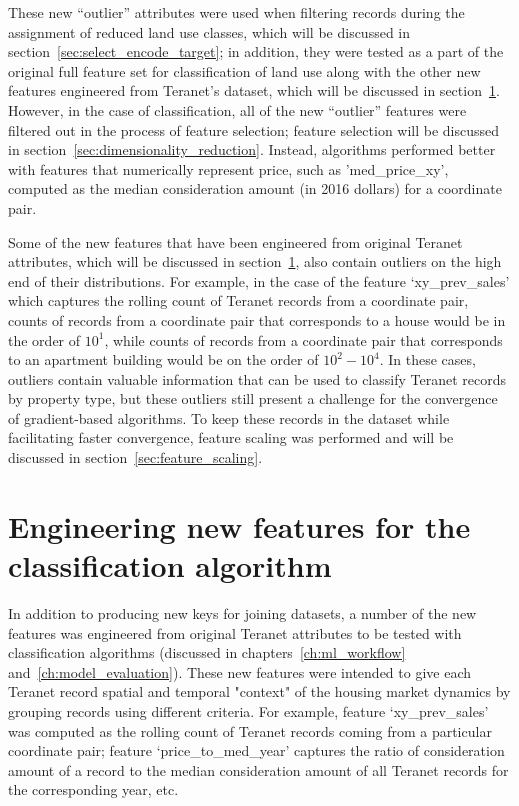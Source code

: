 These new ``outlier'' attributes were used when filtering records during the assignment of reduced land use classes, which will be discussed in section~\ref{sec:select_encode_target};
in addition, they were tested as a part of the original full feature set for classification of land use along with the other new features engineered from Teranet's dataset, which will be discussed in section~\ref{sec:feature_engineering}.
However, in the case of classification, all of the new ``outlier'' features were filtered out in the process of feature selection;
feature selection will be discussed in section~\ref{sec:dimensionality_reduction}.
Instead, algorithms performed better with features that numerically represent price, such as 'med\_price\_xy', computed as the median consideration amount (in 2016 dollars) for a coordinate pair.

Some of the new features that have been engineered from original Teranet attributes, which will be discussed in section~\ref{sec:feature_engineering}, also contain outliers on the high end of their distributions.
For example, in the case of the feature `xy\_prev\_sales' which captures the rolling count of Teranet records from a coordinate pair, counts of records from a coordinate pair that corresponds to a house would be in the order of $10^1$, while counts of records from a coordinate pair that corresponds to an apartment building would be on the order of $10^2-10^4$.
In these cases, outliers contain valuable information that can be used to classify Teranet records by property type, but these outliers still present a challenge for the convergence of gradient-based algorithms.
To keep these records in the dataset while facilitating faster convergence, feature scaling was performed and will be discussed in section~\ref{sec:feature_scaling}.

\section{Engineering new features for the classification algorithm} \label{sec:feature_engineering}

In addition to producing new keys for joining datasets, a number of the new features was engineered from original Teranet attributes to be tested with classification algorithms (discussed in chapters~\ref{ch:ml_workflow} and~\ref{ch:model_evaluation}).
These new features were intended to give each Teranet record spatial and temporal "context" of the housing market dynamics by grouping records using different criteria.
For example, feature `xy\_prev\_sales' was computed as the rolling count of Teranet records coming from a particular coordinate pair;
feature `price\_to\_med\_year' captures the ratio of consideration amount of a record to the median consideration amount of all Teranet records for the corresponding year, etc.

